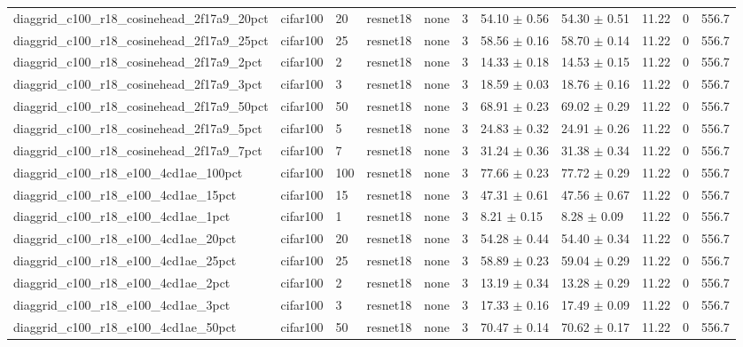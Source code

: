 \begin{tabular}{lllllllllll}
diaggrid_c100_r18_cosinehead_2f17a9_20pct & cifar100 & 20 & resnet18 & none & 3 & 54.10 $\pm$ 0.56 & 54.30 $\pm$ 0.51 & 11.22 & 0 & 556.7 \\
diaggrid_c100_r18_cosinehead_2f17a9_25pct & cifar100 & 25 & resnet18 & none & 3 & 58.56 $\pm$ 0.16 & 58.70 $\pm$ 0.14 & 11.22 & 0 & 556.7 \\
diaggrid_c100_r18_cosinehead_2f17a9_2pct & cifar100 & 2 & resnet18 & none & 3 & 14.33 $\pm$ 0.18 & 14.53 $\pm$ 0.15 & 11.22 & 0 & 556.7 \\
diaggrid_c100_r18_cosinehead_2f17a9_3pct & cifar100 & 3 & resnet18 & none & 3 & 18.59 $\pm$ 0.03 & 18.76 $\pm$ 0.16 & 11.22 & 0 & 556.7 \\
diaggrid_c100_r18_cosinehead_2f17a9_50pct & cifar100 & 50 & resnet18 & none & 3 & 68.91 $\pm$ 0.23 & 69.02 $\pm$ 0.29 & 11.22 & 0 & 556.7 \\
diaggrid_c100_r18_cosinehead_2f17a9_5pct & cifar100 & 5 & resnet18 & none & 3 & 24.83 $\pm$ 0.32 & 24.91 $\pm$ 0.26 & 11.22 & 0 & 556.7 \\
diaggrid_c100_r18_cosinehead_2f17a9_7pct & cifar100 & 7 & resnet18 & none & 3 & 31.24 $\pm$ 0.36 & 31.38 $\pm$ 0.34 & 11.22 & 0 & 556.7 \\
diaggrid_c100_r18_e100_4cd1ae_100pct & cifar100 & 100 & resnet18 & none & 3 & 77.66 $\pm$ 0.23 & 77.72 $\pm$ 0.29 & 11.22 & 0 & 556.7 \\
diaggrid_c100_r18_e100_4cd1ae_15pct & cifar100 & 15 & resnet18 & none & 3 & 47.31 $\pm$ 0.61 & 47.56 $\pm$ 0.67 & 11.22 & 0 & 556.7 \\
diaggrid_c100_r18_e100_4cd1ae_1pct & cifar100 & 1 & resnet18 & none & 3 & 8.21 $\pm$ 0.15 & 8.28 $\pm$ 0.09 & 11.22 & 0 & 556.7 \\
diaggrid_c100_r18_e100_4cd1ae_20pct & cifar100 & 20 & resnet18 & none & 3 & 54.28 $\pm$ 0.44 & 54.40 $\pm$ 0.34 & 11.22 & 0 & 556.7 \\
diaggrid_c100_r18_e100_4cd1ae_25pct & cifar100 & 25 & resnet18 & none & 3 & 58.89 $\pm$ 0.23 & 59.04 $\pm$ 0.29 & 11.22 & 0 & 556.7 \\
diaggrid_c100_r18_e100_4cd1ae_2pct & cifar100 & 2 & resnet18 & none & 3 & 13.19 $\pm$ 0.34 & 13.28 $\pm$ 0.29 & 11.22 & 0 & 556.7 \\
diaggrid_c100_r18_e100_4cd1ae_3pct & cifar100 & 3 & resnet18 & none & 3 & 17.33 $\pm$ 0.16 & 17.49 $\pm$ 0.09 & 11.22 & 0 & 556.7 \\
diaggrid_c100_r18_e100_4cd1ae_50pct & cifar100 & 50 & resnet18 & none & 3 & 70.47 $\pm$ 0.14 & 70.62 $\pm$ 0.17 & 11.22 & 0 & 556.7 \\

\end{tabular}
